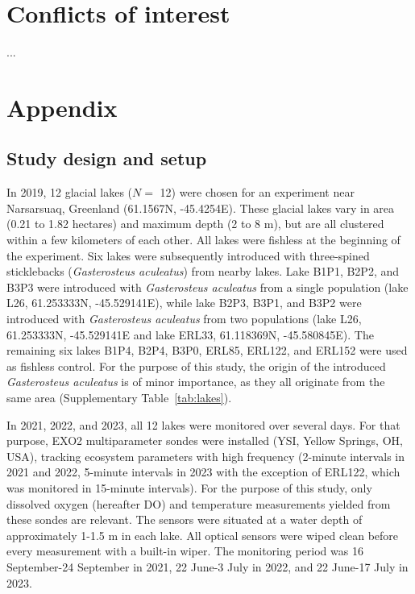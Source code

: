 \documentclass[11pt,lineno]{manuscript}\usepackage[]{graphicx}\usepackage[]{xcolor}
\newcommand{\beginsupplement}{%
        \setcounter{table}{0}
        \renewcommand{\thetable}{S\arabic{table}}%
        \setcounter{figure}{0}
        \renewcommand{\thefigure}{S\arabic{figure}}%
     }
\begin{document}
\section*{Conflicts of interest}
...





\clearpage

\beginsupplement
\renewcommand\figurename{Supplementary Figure}
\renewcommand\tablename{Supplementary Table}

\section*{Appendix}

\subsection{Study design and setup} \label{subsec:design}

In 2019, 12 glacial lakes ($N =$ 12) were chosen for an experiment near Narsarsuaq,
Greenland (61.1567\textdegree{}N, -45.4254\textdegree{}E).
These glacial lakes vary in area (0.21 to 1.82 hectares) and maximum
depth (2 to 8 m), but are all clustered within a few
kilometers of each other. All lakes were fishless at the beginning of the experiment.
Six lakes were subsequently introduced with three-spined sticklebacks
(\textit{Gasterosteus aculeatus}) from nearby lakes.
Lake B1P1, B2P2, and B3P3 were introduced with \textit{Gasterosteus aculeatus} from a single
population (lake L26, 61.253333\textdegree{}N, -45.529141\textdegree{}E),
while lake B2P3, B3P1, and B3P2 were introduced with \textit{Gasterosteus aculeatus} from
two populations (lake L26, 61.253333\textdegree{}N, -45.529141\textdegree{}E
and lake ERL33, 61.118369\textdegree{}N, -45.580845\textdegree{}E).
The remaining six lakes B1P4, B2P4, B3P0, ERL85, ERL122, and ERL152 were
used as fishless control. For the purpose of this study, the origin
of the introduced \textit{Gasterosteus aculeatus} is of minor importance,
as they all originate from the same area (Supplementary Table~\ref{tab:lakes}).

In 2021, 2022, and 2023, all 12 lakes were monitored over several days.
For that purpose, EXO2 multiparameter sondes were installed
(YSI, Yellow Springs, OH, USA), tracking ecosystem parameters with high
frequency (2-minute intervals in 2021 and 2022, 5-minute intervals in
2023 with the exception of ERL122, which was monitored in 15-minute intervals).
For the purpose of this study, only dissolved oxygen (hereafter DO) and temperature measurements
yielded from these sondes are relevant. The sensors were situated at a water depth
of approximately 1-1.5 m in each lake. All optical sensors were
wiped clean before every measurement with a built-in wiper.
The monitoring period was 16 September-24 September in 2021, 22 June-3 July in 2022,
and 22 June-17 July in 2023.
\end{document}
